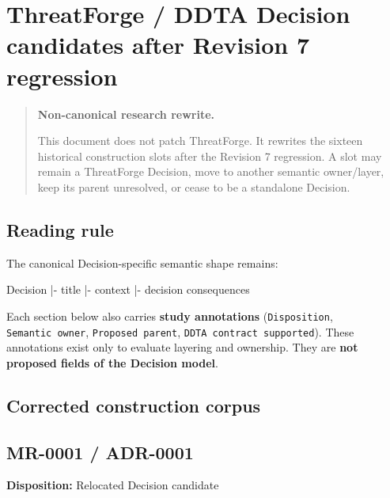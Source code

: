 \documentclass[
  10pt,
  a4paper,
]{article}
\author{}
\date{}
\newenvironment{Shaded}{}{}
\newcommand{\NormalTok}[1]{#1}
\begin{document}
{
\hypersetup{linkcolor=}
\setcounter{tocdepth}{3}
\tableofcontents
}
\section{ThreatForge / DDTA Decision candidates after Revision 7
regression}\label{threatforge-ddta-decision-candidates-after-revision-7-regression}

\begin{quote}
\textbf{Non-canonical research rewrite.}

This document does not patch ThreatForge. It rewrites the sixteen
historical construction slots after the Revision 7 regression. A slot
may remain a ThreatForge Decision, move to another semantic owner/layer,
keep its parent unresolved, or cease to be a standalone Decision.
\end{quote}

\subsection{Reading rule}\label{reading-rule}

The canonical Decision-specific semantic shape remains:

\begin{Shaded}
\begin{Highlighting}[]
\NormalTok{Decision}
\NormalTok{|{-} title}
\NormalTok{|{-} context}
\NormalTok{|{-} decision}
\NormalTok{\textasciigrave{}{-} consequences}
\end{Highlighting}
\end{Shaded}

Each section below also carries \textbf{study annotations}
(\texttt{Disposition}, \texttt{Semantic\ owner},
\texttt{Proposed\ parent}, \texttt{DDTA\ contract\ supported}). These
annotations exist only to evaluate layering and ownership. They are
\textbf{not proposed fields of the Decision model}.

\subsection{Corrected construction
corpus}\label{corrected-construction-corpus}

\subsection{MR-0001 / ADR-0001}\label{mr-0001-adr-0001}

\textbf{Disposition:} Relocated Decision candidate
\end{document}
